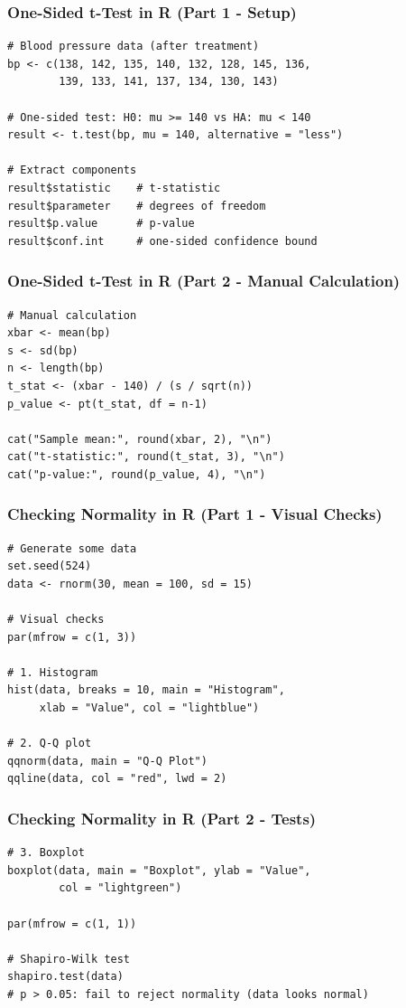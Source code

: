 \documentclass{beamer}
\begin{document}
\begin{frame}[fragile]
\frametitle{One-Sided t-Test in R (Part 1 - Setup)}
\small
\begin{verbatim}
# Blood pressure data (after treatment)
bp <- c(138, 142, 135, 140, 132, 128, 145, 136,
        139, 133, 141, 137, 134, 130, 143)

# One-sided test: H0: mu >= 140 vs HA: mu < 140
result <- t.test(bp, mu = 140, alternative = "less")

# Extract components
result$statistic    # t-statistic
result$parameter    # degrees of freedom
result$p.value      # p-value
result$conf.int     # one-sided confidence bound
\end{verbatim}
\end{frame}

\begin{frame}[fragile]
\frametitle{One-Sided t-Test in R (Part 2 - Manual Calculation)}
\small
\begin{verbatim}
# Manual calculation
xbar <- mean(bp)
s <- sd(bp)
n <- length(bp)
t_stat <- (xbar - 140) / (s / sqrt(n))
p_value <- pt(t_stat, df = n-1)

cat("Sample mean:", round(xbar, 2), "\n")
cat("t-statistic:", round(t_stat, 3), "\n")
cat("p-value:", round(p_value, 4), "\n")
\end{verbatim}
\end{frame}

\begin{frame}[fragile]
\frametitle{Checking Normality in R (Part 1 - Visual Checks)}
\small
\begin{verbatim}
# Generate some data
set.seed(524)
data <- rnorm(30, mean = 100, sd = 15)

# Visual checks
par(mfrow = c(1, 3))

# 1. Histogram
hist(data, breaks = 10, main = "Histogram",
     xlab = "Value", col = "lightblue")

# 2. Q-Q plot
qqnorm(data, main = "Q-Q Plot")
qqline(data, col = "red", lwd = 2)
\end{verbatim}
\end{frame}

\begin{frame}[fragile]
\frametitle{Checking Normality in R (Part 2 - Tests)}
\small
\begin{verbatim}
# 3. Boxplot
boxplot(data, main = "Boxplot", ylab = "Value",
        col = "lightgreen")

par(mfrow = c(1, 1))

# Shapiro-Wilk test
shapiro.test(data)
# p > 0.05: fail to reject normality (data looks normal)
\end{verbatim}
\end{frame}
\end{document}

